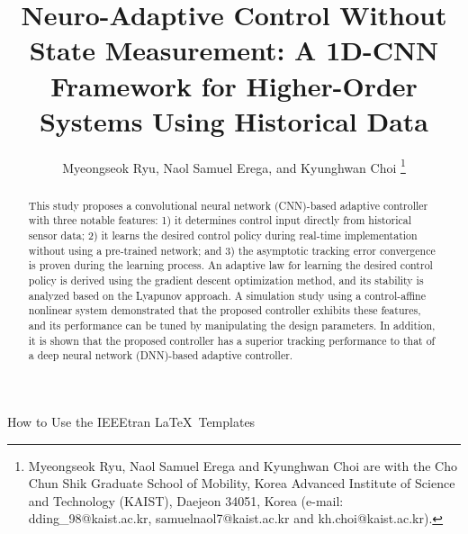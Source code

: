 \documentclass[letterpaper, journal]{IEEEtran}
\begin{document}

\title{
  Neuro-Adaptive Control Without State Measurement: 
  A 1D-CNN Framework for Higher-Order Systems Using Historical Data
} %

\author{
  Myeongseok Ryu, Naol Samuel Erega, and Kyunghwan Choi
\thanks{
  Myeongseok Ryu, Naol Samuel Erega and Kyunghwan Choi are with the Cho Chun Shik Graduate School of Mobility, Korea Advanced Institute of Science and Technology (KAIST), Daejeon 34051, Korea (e-mail: dding\_98@kaist.ac.kr, samuelnaol7@kaist.ac.kr and kh.choi@kaist.ac.kr).

  }
}

%
{How to Use the IEEEtran \LaTeX \ Templates}

\maketitle


\begin{abstract}
  This study proposes a convolutional neural network (CNN)-based adaptive controller with three notable features: 1) it determines control input directly from historical sensor data; 2) it learns the desired control policy during real-time implementation without using a pre-trained network; and 3) the asymptotic tracking error convergence is proven during the learning process. 
  An adaptive law for learning the desired control policy is derived using the gradient descent optimization method, and its stability is analyzed based on the Lyapunov approach. 
  A simulation study using a control-affine nonlinear system demonstrated that the proposed controller exhibits these features, and its performance can be tuned by manipulating the design parameters. 
  In addition, it is shown that the proposed controller has a superior tracking performance to that of a deep neural network (DNN)-based adaptive controller.    
\end{abstract}
\end{document}
